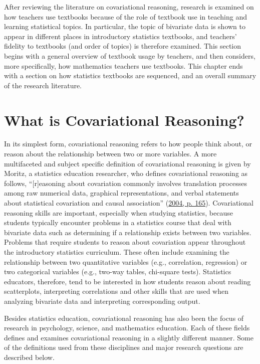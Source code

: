 \documentclass[11pt]{umnthesis}
\begin{document}
After reviewing the literature on covariational reasoning, research is examined on how teachers use textbooks because of the role of textbook use in teaching and learning statistical topics. In particular, the topic of bivariate data is shown to appear in different places in introductory statistics textbooks, and teachers' fidelity to textbooks (and order of topics) is therefore examined. This section begins with a general overview of textbook usage by teachers, and then considers, more specifically, how mathematics teachers use textbooks. This chapter ends with a section on how statistics textbooks are sequenced, and an overall summary of the research literature.

\hypertarget{what-is-covariational-reasoning}{%
\section{What is Covariational Reasoning?}\label{what-is-covariational-reasoning}}

In its simplest form, covariational reasoning refers to how people think about, or reason about the relationship between two or more variables. A more multifaceted and subject specific definition of covariational reasoning is given by Moritz, a statistics education researcher, who defines covariational reasoning as follows, ``{[}r{]}easoning about covariation commonly involves translation processes among raw numerical data, graphical representations, and verbal statements about statistical covariation and causal association'' (\protect\hyperlink{ref-moritz:2004}{2004, p. 165}). Covariational reasoning skills are important, especially when studying statistics, because students typically encounter problems in a statistics course that deal with bivariate data such as determining if a relationship exists between two variables. Problems that require students to reason about covariation appear throughout the introductory statistics curriculum. These often include examining the relationship between two quantitative variables (e.g., correlation, regression) or two categorical variables (e.g., two-way tables, chi-square tests). Statistics educators, therefore, tend to be interested in how students reason about reading scatterplots, interpreting correlations and other skills that are used when analyzing bivariate data and interpreting corresponding output.

Besides statistics education, covariational reasoning has also been the focus of research in psychology, science, and mathematics education. Each of these fields defines and examines covariational reasoning in a slightly different manner. Some of the definitions used from these disciplines and major research questions are described below.
\end{document}
